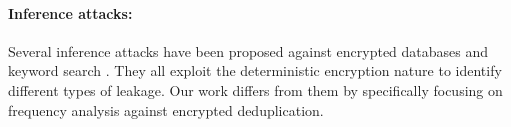 \documentclass[bachelor]{thesis-uestc}
\begin{document}

\paragraph{Inference attacks:}  Several inference attacks have been proposed
against encrypted databases
\cite{grubbs17,bindschaedler17,kellaris16,durak16,naveed15,lacharite18} and 
keyword search \cite{zhang16b,grubbs16,pouliot16,cash15,islam12}.  They all
exploit the deterministic encryption nature to identify different types of
leakage.  Our work differs from them by specifically focusing on frequency analysis against encrypted
deduplication. 

%
\end{document}
